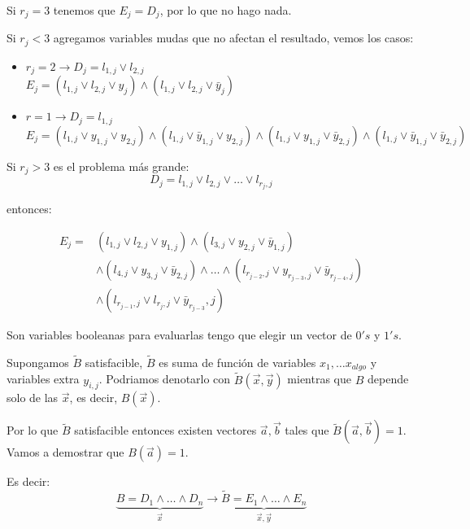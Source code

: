 \documentclass[12pt,a4paper]{article}
\begin{document}
Si $r_{j} = 3$ tenemos que $E_{j} = D_{j}$, por lo que no hago nada.
\medskip

Si $r_{j} < 3$ agregamos variables mudas que no afectan el resultado, vemos los casos:
\begin{itemize}
    \item $r_{j} = 2 \to D_{j}=l_{1,j}\vee l_{2,j}$\\
        $E_{j} = (l_{1,j} \vee l_{2,j} \vee y_{j}) \wedge (l_{1,j} \vee l_{2,j} \vee \bar{y}_{j})$
    \item $r=1 \to D_{j} = l_{1,j}$\\
        $E_{j} = (l_{1,j} \vee y_{1,j} \vee y_{2.j}) \wedge (l_{1,j} \vee \bar{y}_{1,j} \vee y_{2,j}) \wedge 
        (l_{1,j} \vee y_{1,j} \vee \bar{y}_{2,j}) \wedge (l_{1,j} \vee \bar{y}_{1,j} \vee \bar{y}_{2,j})$
\end{itemize}

Si $r_{j} > 3$ es el problema más grande:
$$D_{j} = l_{1,j} \vee l_{2,j} \vee \ldots \vee l_{r_{j},j}$$ 

entonces:

\begin{align*}
    E_{j} = &(l_{1,j} \vee l_{2,j} \vee y_{1,j}) \wedge (l_{3,j} \vee y_{2,j} \vee \bar{y}_{1,j}) \\
    &\wedge (l_{4,j} \vee y_{3,j} \vee \bar{y}_{2,j}) \wedge \ldots \wedge (l_{r_{j-2},j} \vee y_{r_{j-3},j} \vee \bar{y}_{r_{j-4},j})\\
    &\wedge (l_{r_{j-1},j} \vee l_{r_{j},j} \vee \bar{y}_{r_{j-3}},j)
\end{align*}

Son variables booleanas para evaluarlas tengo que elegir un vector de $0's$ y $1's$.
\medskip

Supongamos $\widetilde{B}$ satisfacible, $\widetilde{B}$ es suma de función de variables 
$x_{1},\ldots x_{algo}$ y variables extra $y_{i,j}$. Podriamos denotarlo con 
$\widetilde{B}(\overrightarrow{x}, \overrightarrow{y})$ mientras que $B$ depende 
solo de las $\overrightarrow{x}$, es decir, $B(\overrightarrow{x})$.
\medskip

Por lo que $\widetilde{B}$ satisfacible entonces existen vectores $\overrightarrow{a}, \overrightarrow{b}$
tales que $\widetilde{B}(\overrightarrow{a}, \overrightarrow{b}) = 1$. Vamos a demostrar 
que $B(\overrightarrow{a}) = 1$.
\medskip

Es decir:
$$\underbrace{B = D_{1} \wedge \ldots \wedge D_{n}}_{\overrightarrow{x}} \to \underbrace{\widetilde{B} = E_{1} \wedge \ldots \wedge E_{n}}_{\overrightarrow{x}, \overrightarrow{y}}$$
\end{document}
